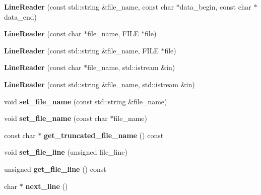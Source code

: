 \begin{DoxyCompactItemize}
{\bfseries Line\+Reader} (const std\+::string \&file\+\_\+name, const char $\ast$data\+\_\+begin, const char $\ast$data\+\_\+end)
\item 
\mbox{\label{classio_1_1_line_reader_ad2a8943ba0848ae5052e2f5ad30c010e}} 
{\bfseries Line\+Reader} (const char $\ast$file\+\_\+name, F\+I\+LE $\ast$file)
\item 
\mbox{\label{classio_1_1_line_reader_a93fa2e3ae98b0e7a7391714d6395c552}} 
{\bfseries Line\+Reader} (const std\+::string \&file\+\_\+name, F\+I\+LE $\ast$file)
\item 
\mbox{\label{classio_1_1_line_reader_a301c08eb9ca5d3fdccf4e9a8e5ac82f8}} 
{\bfseries Line\+Reader} (const char $\ast$file\+\_\+name, std\+::istream \&in)
\item 
\mbox{\label{classio_1_1_line_reader_a3eacf4d1539a24122c6897fce4e72f06}} 
{\bfseries Line\+Reader} (const std\+::string \&file\+\_\+name, std\+::istream \&in)
\item 
\mbox{\label{classio_1_1_line_reader_a1a0763d491dec16cebc33134e965dfee}} 
void {\bfseries set\+\_\+file\+\_\+name} (const std\+::string \&file\+\_\+name)
\item 
\mbox{\label{classio_1_1_line_reader_a81c56ac68497da5ec874333ce063fd83}} 
void {\bfseries set\+\_\+file\+\_\+name} (const char $\ast$file\+\_\+name)
\item 
\mbox{\label{classio_1_1_line_reader_ad5817da6af1ae77daddec7aeaeebf2f8}} 
const char $\ast$ {\bfseries get\+\_\+truncated\+\_\+file\+\_\+name} () const
\item 
\mbox{\label{classio_1_1_line_reader_a581b55d4ced6adb964de50fa8ac6eb08}} 
void {\bfseries set\+\_\+file\+\_\+line} (unsigned file\+\_\+line)
\item 
\mbox{\label{classio_1_1_line_reader_a3f3459e22ed8e459238c290050b6722e}} 
unsigned {\bfseries get\+\_\+file\+\_\+line} () const
\item 
\mbox{\label{classio_1_1_line_reader_a97f4e0129611d9da2b8c966ffe670be5}} 
char $\ast$ {\bfseries next\+\_\+line} ()
\end{DoxyCompactItemize}


